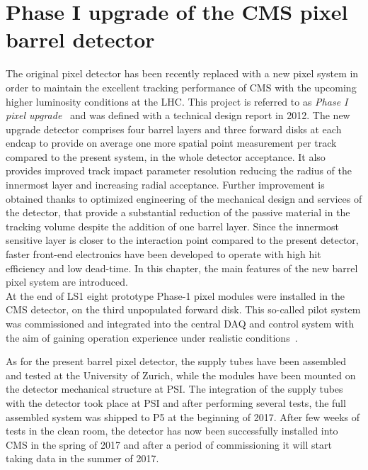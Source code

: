 \chapter{Phase I upgrade of the CMS pixel barrel detector}
\label{ch:Phase1Intro}

The original pixel detector has been recently replaced with a new pixel system in order to maintain the excellent tracking performance of CMS with the upcoming higher luminosity conditions at the LHC.
This project is referred to as \textit{Phase I pixel upgrade}~\cite{Dominguez:1481838} and was defined with a technical design report in 2012. The new upgrade detector comprises four barrel layers and three forward disks at each endcap to provide on average one more spatial point measurement per track compared to the present system, in the whole detector acceptance. It also provides improved track impact parameter resolution reducing the radius of the innermost layer and increasing radial acceptance. 
Further improvement is obtained thanks to optimized engineering of the mechanical design and services of the detector, that provide a substantial reduction of the passive material in the tracking volume despite the addition of one barrel layer. Since the innermost sensitive layer is closer to the interaction point compared to the present detector, faster front-end electronics have been developed to operate with high hit efficiency and low dead-time.
In this chapter, the main features of the new barrel pixel system are introduced.\\

At the end of LS1 eight prototype Phase-1 pixel modules were installed in the CMS detector, on the third unpopulated forward disk. This so-called pilot system was commissioned and integrated into the central DAQ and control system with the aim of gaining operation experience under realistic conditions~\cite{Akgun:2015afw}.

As for the present barrel pixel detector, the supply tubes have been assembled and tested at the University of Zurich, while the modules have been mounted on the detector mechanical structure at PSI.
The integration of the supply tubes with the detector took place at PSI and after performing several tests, the full assembled system was shipped to P5 at the beginning of 2017.
After few weeks of tests in the clean room, the detector has now been successfully installed into CMS in the spring of 2017 and after a period of commissioning it will start taking data in the summer of 2017.

